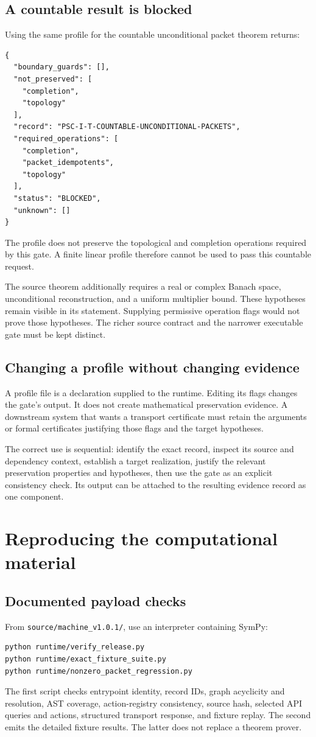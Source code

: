 \documentclass[a4paper,11pt]{article}
\begin{document}
\subsection{A countable result is blocked}
Using the same profile for the countable unconditional packet theorem returns:

\begin{lstlisting}
{
  "boundary_guards": [],
  "not_preserved": [
    "completion",
    "topology"
  ],
  "record": "PSC-I-T-COUNTABLE-UNCONDITIONAL-PACKETS",
  "required_operations": [
    "completion",
    "packet_idempotents",
    "topology"
  ],
  "status": "BLOCKED",
  "unknown": []
}
\end{lstlisting}

The profile does not preserve the topological and completion operations required by this gate. A finite linear profile therefore cannot be used to pass this countable request.

The source theorem additionally requires a real or complex Banach space, unconditional reconstruction, and a uniform multiplier bound. These hypotheses remain visible in its statement. Supplying permissive operation flags would not prove those hypotheses. The richer source contract and the narrower executable gate must be kept distinct.
\subsection{Changing a profile without changing evidence}
A profile file is a declaration supplied to the runtime. Editing its flags changes the gate's output. It does not create mathematical preservation evidence. A downstream system that wants a transport certificate must retain the arguments or formal certificates justifying those flags and the target hypotheses.

The correct use is sequential: identify the exact record, inspect its source and dependency context, establish a target realization, justify the relevant preservation properties and hypotheses, then use the gate as an explicit consistency check. Its output can be attached to the resulting evidence record as one component.

\section{Reproducing the computational material}
\subsection{Documented payload checks}
From \nolinkurl{source/machine_v1.0.1/}, use an interpreter containing SymPy:
\begin{lstlisting}
python runtime/verify_release.py
python runtime/exact_fixture_suite.py
python runtime/nonzero_packet_regression.py
\end{lstlisting}
The first script checks entrypoint identity, record IDs, graph acyclicity and resolution, AST coverage, action-registry consistency, source hash, selected API queries and actions, structured transport response, and fixture replay. The second emits the detailed fixture results. The latter does not replace a theorem prover.
\end{document}
